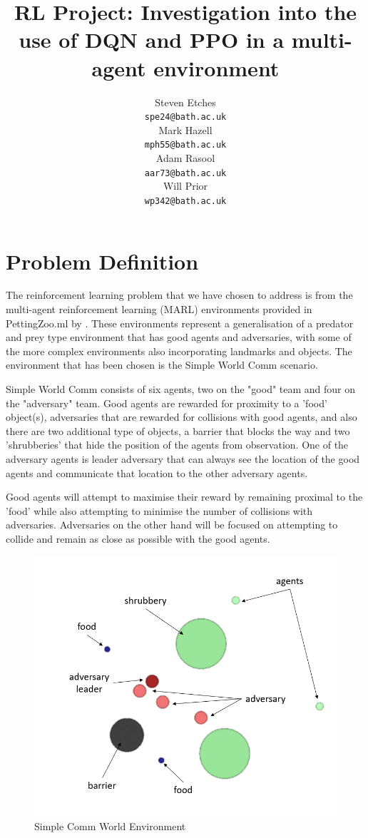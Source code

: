 \documentclass{article}
\title{RL Project: Investigation into the use of DQN and PPO in a multi-agent environment}
\author{
  Steven Etches \\
  \texttt{spe24@bath.ac.uk} \\
  \And
  Mark Hazell \\
  \texttt{mph55@bath.ac.uk} \\
  \And
  Adam Rasool \\
  \texttt{aar73@bath.ac.uk} \\
  \And
  Will Prior \\
  \texttt{wp342@bath.ac.uk}
}
\begin{document}
\maketitle

\section{Problem Definition} \label{Problem Definition}

The reinforcement learning problem that we have chosen to address is from the multi-agent reinforcement learning (MARL) environments provided in PettingZoo.ml by \citet{terry2020pettingzoo}.
These environments represent a generalisation of a predator and prey type environment that has good agents and adversaries, with some of the more complex environments also incorporating landmarks and objects.
The environment that has been chosen is the Simple World Comm scenario.

Simple World Comm consists of six agents, two on the "good" team and four on the "adversary" team.
Good agents are rewarded for proximity to a 'food' object(s), adversaries that are rewarded for collisions with good agents, and also there are two additional type of objects, a barrier that blocks the way and two 'shrubberies' that hide the position of the agents from observation.
One of the adversary agents is leader adversary that can always see the location of the good agents and communicate that location to the other adversary agents.

Good agents will attempt to maximise their reward by remaining proximal to the 'food' while also attempting to minimise the number of collisions with adversaries.
Adversaries on the other hand will be focused on attempting to collide and remain as close as possible with the good agents.

\begin{figure}[!ht]
  \centering
  \includegraphics[scale=0.25]{simple_comm_environment.png}
  \caption{Simple Comm World Environment}
  \label{fig:simple_comm_world}
\end{figure}
\end{document}

